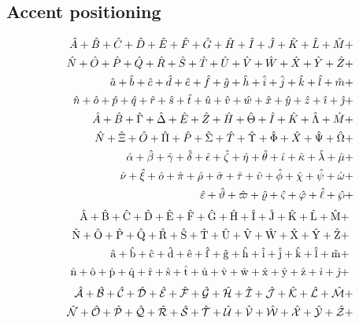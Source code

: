 \documentclass{article}
\def\test#1{#1}
\def\testupperi{%
  \test A \test B \test C \test D \test E \test F \test G \test H
  \test I \test J \test K \test L \test M }
\def\testupperii{%
  \test N \test O \test P \test Q \test R \test S \test T \test U
  \test V \test W \test X \test Y \test Z }
\def\testloweri{%
  \test a \test b \test c \test d \test e \test f \test g \test h
  \test i \test j \test k \test l \test m }
\def\testlowerii{%
  \test n \test o \test p \test q \test r \test s \test t \test u
  \test v \test w \test x \test y \test z 
  \test\imath \test\jmath }
\def\testupgreeki{%
  \test A \test B \test\Gamma \test\Delta \test E \test Z \test H
  \test\Theta \test I \test K \test\Lambda \test M }
\def\testupgreekii{%
  \test N \test\Xi \test O \test\Pi \test P \test\Sigma \test T
  \test\Upsilon \test\Phi \test X \test\Psi \test\Omega 
}
\def\testlowgreeki{%
  \test\alpha \test\beta \test\gamma \test\delta \test\epsilon
  \test\zeta \test\eta \test\theta \test\iota \test\kappa \test\lambda
  \test\mu }
\def\testlowgreekii{%
  \test\nu \test\xi \test o \test\pi \test\rho \test\sigma \test\tau
  \test\upsilon \test\phi \test\chi \test\psi \test\omega }
\def\testlowgreekiii{%
  \test\varepsilon \test\vartheta \test\varpi \test\varrho
  \test\varsigma \test\varphi \test\ell \test\wp}
\begin{document}
\clearpage
\subsection{Accent positioning}

\def\test#1{\hat{#1}+}%
\begin{eqnarray*}
  && {\testupperi}\\
  && {\testupperii}\\
  && {\testloweri}\\ 
  && {\testlowerii}\\ 
  && {\testupgreeki}\\
  && {\testupgreekii}\\
  && {\testlowgreeki}\\
  && {\testlowgreekii}\\
  && {\testlowgreekiii}
\end{eqnarray*}%
%
\def\test#1{\hat{\mathrm{#1}}+}%
\begin{eqnarray*}
  && {\testupperi}\\
  && {\testupperii}\\
  && {\testloweri}\\ 
  && {\testlowerii}\\ 
\end{eqnarray*}%
%
%
\def\test#1{\hat{\mathcal{#1}}+}%
\begin{eqnarray*}
  && {\testupperi}\\
  && {\testupperii}
\end{eqnarray*}%
\end{document}
